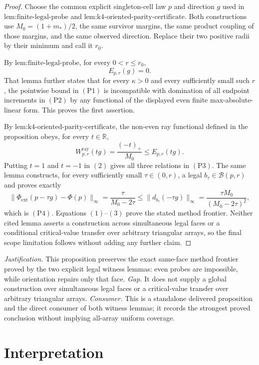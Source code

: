 \documentclass{article}
\begin{document}
\begin{proof}
Choose the common explicit singleton-cell law \(p\) and direction \(g\) used in \(\text{lem:finite-legal-probe}\) and \(\text{lem:k4-oriented-parity-certificate}\).  Both constructions use \(M_0=(1+m_*)/2\), the same survivor margins, the same product coupling of those margins, and the same observed direction.  Replace their two positive radii by their minimum and call it \(r_0\).

By \(\text{lem:finite-legal-probe}\), for every \(0<r\le r_0\),
\[
 E_{p,r}(g)=0.
\tag{1}
\]
That lemma further states that for every \(\kappa>0\) and every sufficiently small such \(r\), the pointwise bound in \((\mathrm{P1})\) is incompatible with domination of all endpoint increments in \((\mathrm{P2})\) by any functional of the displayed even finite max-absolute-linear form.  This proves the first assertion.

By \(\text{lem:k4-oriented-parity-certificate}\), the non-even ray functional defined in the proposition obeys, for every \(t\in\mathbb R\),
\[
 W^{\mathrm{ray}}_{p,r}(tg)=\frac{(-t)_+}{M_0}
 \le E_{p,r}(tg).
\tag{2}
\]
Putting \(t=1\) and \(t=-1\) in \((2)\) gives all three relations in \((\mathrm{P3})\).  The same lemma constructs, for every sufficiently small \(\tau\in(0,r)\), a legal \(b_\tau\in\mathcal B(p,r)\) and proves exactly
\[
 \|\Phi_{\mathrm{ext}}(p-\tau g)-\Phi(p)\|_\infty
 =\frac{\tau}{M_0-2\tau}
 \le\|d_{b_\tau}(-\tau g)\|_\infty
 =\frac{\tau M_0}{(M_0-2\tau)^2},
\tag{3}
\]
which is \((\mathrm{P4})\).  Equations \((1)\)--\((3)\) prove the stated method frontier.  Neither cited lemma asserts a construction across simultaneous legal faces or a conditional critical-value transfer over arbitrary triangular arrays, so the final scope limitation follows without adding any further claim.
\end{proof}
\par\smallskip\noindent \textit{Justification.} This proposition preserves the exact same-face method frontier proved by the two explicit legal witness lemmas: even probes are impossible, while orientation repairs only that face. \textit{Gap.} It does not supply a global construction over simultaneous legal faces or a critical-value transfer over arbitrary triangular arrays. \textit{Consumer.} This is a standalone delivered proposition and the direct consumer of both witness lemmas; it records the strongest proved conclusion without implying all-array uniform coverage.

\section{Interpretation}
\end{document}
